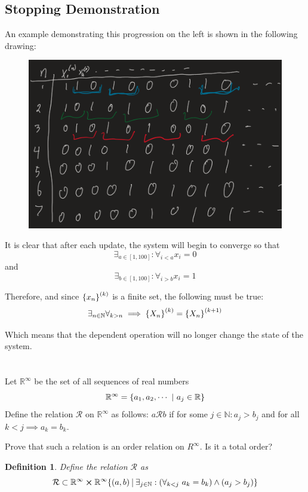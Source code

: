 \documentclass[]{article}
\newcommand{\Rel}{\mathcal{R}}
\newcommand{\R}{\mathbb{R}}
\newcommand{\N}{\mathbb{N}}
\newcommand{\st}{ \ \vline \ }
\newtheorem{definition}{Definition}
\begin{document}
\newpage
\subsection*{Stopping Demonstration}
An example demonstrating this progression on the left is shown in the following drawing: 
\begin{figure}[h]
    \centering
    \includegraphics[width = 0.7 \textwidth]{MidExam1_pblm1_b.png}
\end{figure}

It is clear that after each update, the system will begin to converge so that 
$$\exists_{a \in [1,100]} : \forall_{i < a} x_i = 0$$ and 
$$\exists_{b \in [1,100]} : \forall_{i > b} x_i = 1$$

Therefore, and since $\qty{x_n}^{(k)}$ is a finite set, the following must be true:
$$\exists_{n \in \N} \forall_{k > n} \implies \qty{X_n}^{(k)} = \qty{X_n}^{(k+1)}$$

Which means that the dependent operation will no longer change the state of the system.

\newpage
\section{}
Let $\R^\infty$ be the set of all sequences of real numbers
$$\R^\infty = \qty{a_1,a_2,\cdots \ | \ a_j \in \R}$$
Define the relation $\Rel$ on $\R^\infty$ as follows:
$a\Rel b$ if for some $j \in \N : a_j > b_j$ and for all $k < j \implies a_k = b_k$.

Prove that such a relation is an order relation on $R^\infty$. Is it a total order?

\begin{definition}
    Define the relation $\Rel$ as
    $$\Rel \subset \R^\infty \cross \R^\infty \qty{(a,b) \st 
        \exists_{j\in\N} : \qty(\forall_{k < j} \ a_k = b_k) \land (a_j > b_j)}$$
\end{definition}
\end{document}
